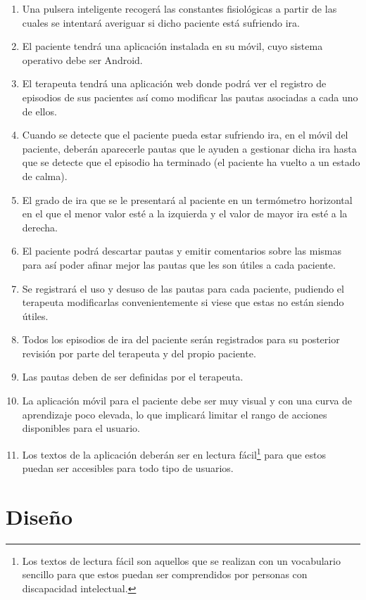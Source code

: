 \begin{enumerate}
    \item Una pulsera inteligente recogerá las constantes fisiológicas a partir de las cuales se intentará averiguar si dicho paciente está sufriendo ira.
    \item El paciente tendrá una aplicación instalada en su móvil, cuyo sistema operativo debe ser Android.
    \item El terapeuta tendrá una aplicación web donde podrá ver el registro de episodios de sus pacientes así como modificar las pautas asociadas a cada uno de ellos.
    \item Cuando se detecte que el paciente pueda estar sufriendo ira, en el móvil del paciente, deberán aparecerle pautas que le ayuden a gestionar dicha ira hasta que se detecte que el episodio ha terminado (el paciente ha vuelto a un estado de calma).
    \item El grado de ira que se le presentará al paciente en un termómetro horizontal en el que el menor valor esté a la izquierda y el valor de mayor ira esté a la derecha.
    \item El paciente podrá descartar pautas y emitir comentarios sobre las mismas para así poder afinar mejor las pautas que les son útiles a cada paciente.
    \item Se registrará el uso y desuso de las pautas para cada paciente, pudiendo el terapeuta modificarlas convenientemente si viese que estas no están siendo útiles.
    \item Todos los episodios de ira del paciente serán registrados para su posterior revisión por parte del terapeuta y del propio paciente.
    \item Las pautas deben de ser definidas por el terapeuta.
    \item La aplicación móvil para el paciente debe ser muy visual y con una curva de aprendizaje poco elevada, lo que implicará limitar el rango de acciones disponibles para el usuario.
    \item Los textos de la aplicación deberán ser en lectura fácil\footnote{Los textos de lectura fácil son aquellos que se realizan con un vocabulario sencillo para que estos puedan ser comprendidos por personas con discapacidad intelectual.} para que estos puedan ser accesibles para todo tipo de usuarios.
\end{enumerate}

\section{Diseño}
\label{sec:c4:diseño}
